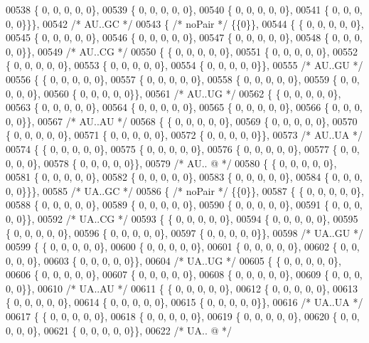 \begin{DoxyCode}
00538 \{  0, 0, 0, 0, 0\},
00539 \{  0, 0, 0, 0, 0\},
00540 \{  0, 0, 0, 0, 0\},
00541 \{  0, 0, 0, 0, 0\}\}\},
00542  \textcolor{comment}{/* AU..GC */}
00543 \{ \textcolor{comment}{/* noPair */} \{\{0\}\},
00544 \{ \{  0, 0, 0, 0, 0\},
00545 \{  0, 0, 0, 0, 0\},
00546 \{  0, 0, 0, 0, 0\},
00547 \{  0, 0, 0, 0, 0\},
00548 \{  0, 0, 0, 0, 0\}\},
00549  \textcolor{comment}{/* AU..CG */}
00550 \{ \{  0, 0, 0, 0, 0\},
00551 \{  0, 0, 0, 0, 0\},
00552 \{  0, 0, 0, 0, 0\},
00553 \{  0, 0, 0, 0, 0\},
00554 \{  0, 0, 0, 0, 0\}\},
00555  \textcolor{comment}{/* AU..GU */}
00556 \{ \{  0, 0, 0, 0, 0\},
00557 \{  0, 0, 0, 0, 0\},
00558 \{  0, 0, 0, 0, 0\},
00559 \{  0, 0, 0, 0, 0\},
00560 \{  0, 0, 0, 0, 0\}\},
00561  \textcolor{comment}{/* AU..UG */}
00562 \{ \{  0, 0, 0, 0, 0\},
00563 \{  0, 0, 0, 0, 0\},
00564 \{  0, 0, 0, 0, 0\},
00565 \{  0, 0, 0, 0, 0\},
00566 \{  0, 0, 0, 0, 0\}\},
00567  \textcolor{comment}{/* AU..AU */}
00568 \{ \{  0, 0, 0, 0, 0\},
00569 \{  0, 0, 0, 0, 0\},
00570 \{  0, 0, 0, 0, 0\},
00571 \{  0, 0, 0, 0, 0\},
00572 \{  0, 0, 0, 0, 0\}\},
00573  \textcolor{comment}{/* AU..UA */}
00574 \{ \{  0, 0, 0, 0, 0\},
00575 \{  0, 0, 0, 0, 0\},
00576 \{  0, 0, 0, 0, 0\},
00577 \{  0, 0, 0, 0, 0\},
00578 \{  0, 0, 0, 0, 0\}\},
00579  \textcolor{comment}{/* AU.. @ */}
00580 \{ \{  0, 0, 0, 0, 0\},
00581 \{  0, 0, 0, 0, 0\},
00582 \{  0, 0, 0, 0, 0\},
00583 \{  0, 0, 0, 0, 0\},
00584 \{  0, 0, 0, 0, 0\}\}\},
00585  \textcolor{comment}{/* UA..GC */}
00586 \{ \textcolor{comment}{/* noPair */} \{\{0\}\},
00587 \{ \{  0, 0, 0, 0, 0\},
00588 \{  0, 0, 0, 0, 0\},
00589 \{  0, 0, 0, 0, 0\},
00590 \{  0, 0, 0, 0, 0\},
00591 \{  0, 0, 0, 0, 0\}\},
00592  \textcolor{comment}{/* UA..CG */}
00593 \{ \{  0, 0, 0, 0, 0\},
00594 \{  0, 0, 0, 0, 0\},
00595 \{  0, 0, 0, 0, 0\},
00596 \{  0, 0, 0, 0, 0\},
00597 \{  0, 0, 0, 0, 0\}\},
00598  \textcolor{comment}{/* UA..GU */}
00599 \{ \{  0, 0, 0, 0, 0\},
00600 \{  0, 0, 0, 0, 0\},
00601 \{  0, 0, 0, 0, 0\},
00602 \{  0, 0, 0, 0, 0\},
00603 \{  0, 0, 0, 0, 0\}\},
00604  \textcolor{comment}{/* UA..UG */}
00605 \{ \{  0, 0, 0, 0, 0\},
00606 \{  0, 0, 0, 0, 0\},
00607 \{  0, 0, 0, 0, 0\},
00608 \{  0, 0, 0, 0, 0\},
00609 \{  0, 0, 0, 0, 0\}\},
00610  \textcolor{comment}{/* UA..AU */}
00611 \{ \{  0, 0, 0, 0, 0\},
00612 \{  0, 0, 0, 0, 0\},
00613 \{  0, 0, 0, 0, 0\},
00614 \{  0, 0, 0, 0, 0\},
00615 \{  0, 0, 0, 0, 0\}\},
00616  \textcolor{comment}{/* UA..UA */}
00617 \{ \{  0, 0, 0, 0, 0\},
00618 \{  0, 0, 0, 0, 0\},
00619 \{  0, 0, 0, 0, 0\},
00620 \{  0, 0, 0, 0, 0\},
00621 \{  0, 0, 0, 0, 0\}\},
00622  \textcolor{comment}{/* UA.. @ */}

\end{DoxyCode}
